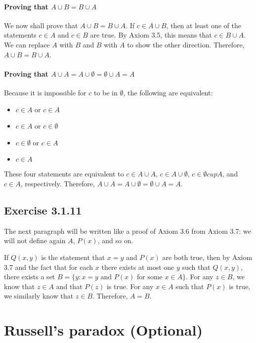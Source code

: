 \documentclass[12pt, oneside]{book}
\begin{document}
	\paragraph*{Proving that $A \cup B = B \cup A$}

	We now shall prove that $A \cup B = B \cup A$. If $c \in A \cup B$, then at least one of the statements $c \in A$ and $c \in B$ are true. By Axiom 3.5, this means that $c \in B \cup A$. We can replace $A$ with $B$ and $B$ with $A$ to show the other direction. Therefore, $A \cup B = B \cup A$.

	\paragraph*{Proving that $A \cup A = A \cup \emptyset = \emptyset \cup A = A$}

	Because it is impossible for $c$ to be in $\emptyset$, the following are equivalent:
	\begin{itemize}
		\item $c \in A$ or $c \in A$
		\item $c \in A$ or $c \in \emptyset$
		\item $c \in \emptyset$ or $c \in A$
		\item $c \in A$
	\end{itemize}
	These four statements are equivalent to $c \in A \cup A$, $c \in A \cup \emptyset$, $c \in \emptyset cup A$, and $c \in A$, respectively. Therefore, $A \cup A = A \cup \emptyset = \emptyset \cup A = A$.

	\subsection*{Exercise 3.1.11}

	The next paragraph will be written like a proof of Axiom 3.6 from Axiom 3.7: we will not define again $A$, $P(x)$, and so on.

	If $Q(x, y)$ is the statement that $x = y$ and $P(x)$ are both true, then by Axiom 3.7 and the fact that for each $x$ there exists at most one $y$ such that $Q(x, y)$, there exists a set $B = \{y: x = y \text{ and } P(x) \text{ for some } x \in A\}$. For any $z \in B$, we know that $z \in A$ and that $P(z)$ is true. For any $x \in A$ such that $P(x)$ is true, we similarly know that $z \in B$. Therefore, $A = B$.

	\section{Russell's paradox (Optional)}
\end{document}

